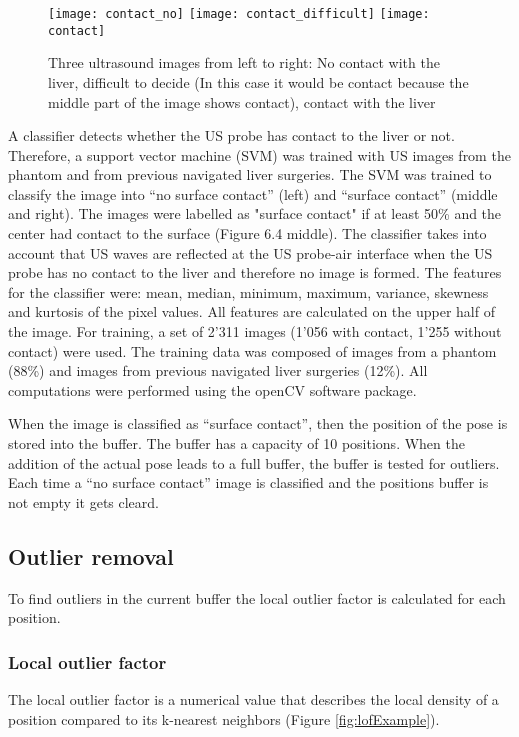 \begin{figure}[H]
  \centering
  \texttt{[image: contact\_no]}
  \endminipage
  \hfill
  \texttt{[image: contact\_difficult]}
  \endminipage
  \hfill
  \texttt{[image: contact]}
  \endminipage
  \hfill 
 \caption{Three ultrasound images from left to right: No contact with the liver,
   difficult to decide (In this case it would be contact because the middle part
   of the image shows contact), contact with the liver}
  \label{fig:contactVSnocontact}
\end{figure}

A classifier detects whether the US probe has contact to the liver or not. Therefore, a support vector machine (SVM) was trained with US images
from the phantom and from previous navigated liver surgeries. The SVM was trained to
classify the image into ``no surface contact'' (left) and ``surface contact'' (middle and right).
The images were labelled as "surface contact" if at least 50\% and the center had contact
to the surface (Figure 6.4 middle). The classifier takes into account that US waves are
reflected at the US probe-air interface when the US probe has no contact to the liver and
therefore no image is formed. The features for the classifier were: mean, median, minimum,
maximum, variance, skewness and kurtosis of the pixel values. All features are calculated
on the upper half of the image. For training, a set of 2'311 images (1'056 with contact, 1'255
without contact) were used. The training data was composed of images from a phantom
(88\%) and images from previous navigated liver surgeries (12\%). All computations were
performed using the openCV software package.

When the image is classified as ``surface contact'', then the position of the pose is stored
into the buffer. The buffer has a capacity of 10 positions. When
the addition of the actual pose leads to a full buffer, the buffer is
tested for outliers.
Each time a ``no surface contact'' image is classified and the positions buffer
is not empty it gets cleard.
\subsection{Outlier removal}
To find outliers in the current buffer the local
outlier factor is calculated for each position. 

\subsubsection{Local outlier factor}
The local outlier factor is a numerical value that describes the local density
of a position compared to its k-nearest neighbors (Figure
\ref{fig:lofExample}).

